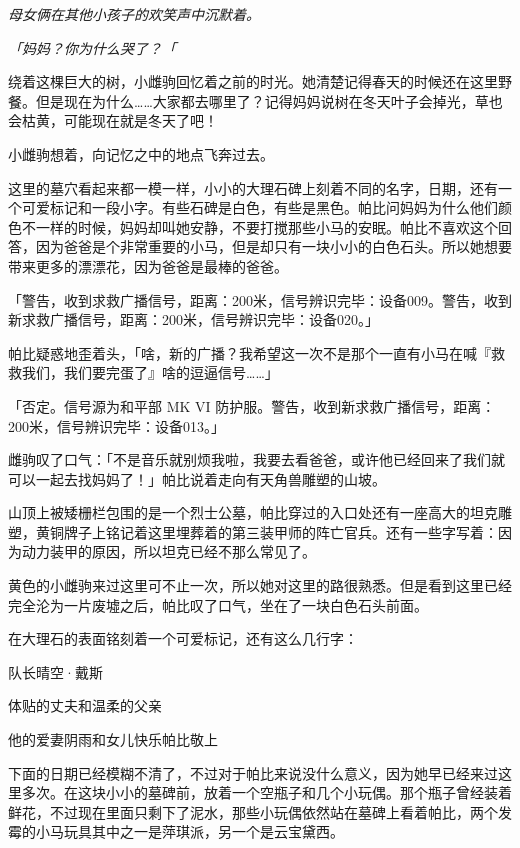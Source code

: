 
\emph{母女俩在其他小孩子的欢笑声中沉默着。}

\emph{「妈妈？你为什么哭了？「}

绕着这棵巨大的树，小雌驹回忆着之前的时光。她清楚记得春天的时候还在这里野餐。但是现在为什么……大家都去哪里了？记得妈妈说树在冬天叶子会掉光，草也会枯黄，可能现在就是冬天了吧！

小雌驹想着，向记忆之中的地点飞奔过去。

\horizonline


这里的墓穴看起来都一模一样，小小的大理石碑上刻着不同的名字，日期，还有一个可爱标记和一段小字。有些石碑是白色，有些是黑色。帕比问妈妈为什么他们颜色不一样的时候，妈妈却叫她安静，不要打搅那些小马的安眠。帕比不喜欢这个回答，因为爸爸是个非常重要的小马，但是却只有一块小小的白色石头。所以她想要带来更多的漂漂花，因为爸爸是最棒的爸爸。

「{\mt 警告，收到求救广播信号，距离：200米，信号辨识完毕：设备009。警告，收到新求救广播信号，距离：200米，信号辨识完毕：设备020。}」

帕比疑惑地歪着头，「啥，新的广播？我希望这一次不是那个一直有小马在喊『救救我们，我们要完蛋了』啥的逗逼信号……」

「{\mt 否定。信号源为和平部 MK VI 防护服。警告，收到新求救广播信号，距离：200米，信号辨识完毕：设备013。}」

雌驹叹了口气：「不是音乐就别烦我啦，我要去看爸爸，或许他已经回来了我们就可以一起去找妈妈了！」帕比说着走向有天角兽雕塑的山坡。

山顶上被矮栅栏包围的是一个烈士公墓，帕比穿过的入口处还有一座高大的坦克雕塑，黄铜牌子上铭记着这里埋葬着的第三装甲师的阵亡官兵。还有一些字写着：因为动力装甲的原因，所以坦克已经不那么常见了。

黄色的小雌驹来过这里可不止一次，所以她对这里的路很熟悉。但是看到这里已经完全沦为一片废墟之后，帕比叹了口气，坐在了一块白色石头前面。

在大理石的表面铭刻着一个可爱标记，还有这么几行字：

\begin{center}
    队长晴空·戴斯

    体贴的丈夫和温柔的父亲
    
    他的爱妻阴雨和女儿快乐帕比敬上
\end{center}

下面的日期已经模糊不清了，不过对于帕比来说没什么意义，因为她早已经来过这里多次。在这块小小的墓碑前，放着一个空瓶子和几个小玩偶。那个瓶子曾经装着鲜花，不过现在里面只剩下了泥水，那些小玩偶依然站在墓碑上看着帕比，两个发霉的小马玩具其中之一是萍琪派，另一个是云宝黛西。

